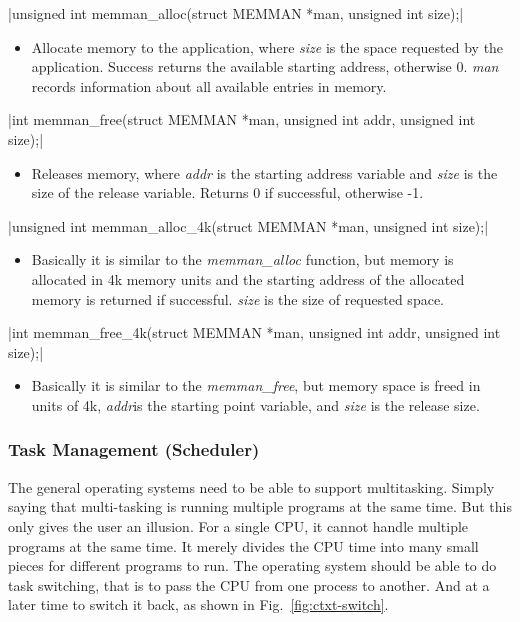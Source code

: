 \documentclass{swfcthesis}
\begin{document}
\csingle|unsigned int memman_alloc(struct MEMMAN *man, unsigned int size);|
\begin{itemize}
\item Allocate memory to the application, where \emph{size} is the space requested by the
  application. Success returns the available starting address, otherwise 0. \emph{man} records
  information about all available entries in memory.
  
\end{itemize}

\csingle|int memman_free(struct MEMMAN *man, unsigned int addr, unsigned int size);|
\begin{itemize}
\item Releases memory, where \emph{addr} is the starting address variable and
  \emph{size} is the size of the release variable. Returns 0 if successful, otherwise
  -1.
\end{itemize}

\csingle|unsigned int memman_alloc_4k(struct MEMMAN *man, unsigned int size);|
\begin{itemize}
\item Basically it is similar to the \emph{memman\_alloc} function, but memory is allocated
  in 4k memory units and the starting address of the allocated memory is returned if
  successful. \emph{size} is the size of requested space.
\end{itemize}

\csingle|int memman_free_4k(struct MEMMAN *man, unsigned int addr, unsigned int size);|
\begin{itemize}
\item Basically it is similar to the \emph{memman\_free}, but memory space is freed in
  units of 4k, \emph{addr}is the starting point variable, and \emph{size} is the
  release size.
\end{itemize}

\subsubsection{Task Management (Scheduler)}
\label{sec:task-management}

The general operating systems need to be able to support multitasking. Simply saying that
multi-tasking is running multiple programs at the same time. But this only gives the user
an illusion. For a single CPU, it cannot handle multiple programs at the same time. It
merely divides the CPU time into many small pieces for different programs to run. The
operating system should be able to do task switching, that is to pass the CPU from one
process to another. And at a later time to switch it back, as shown in
Fig.~\ref{fig:ctxt-switch}. 
\end{document}

